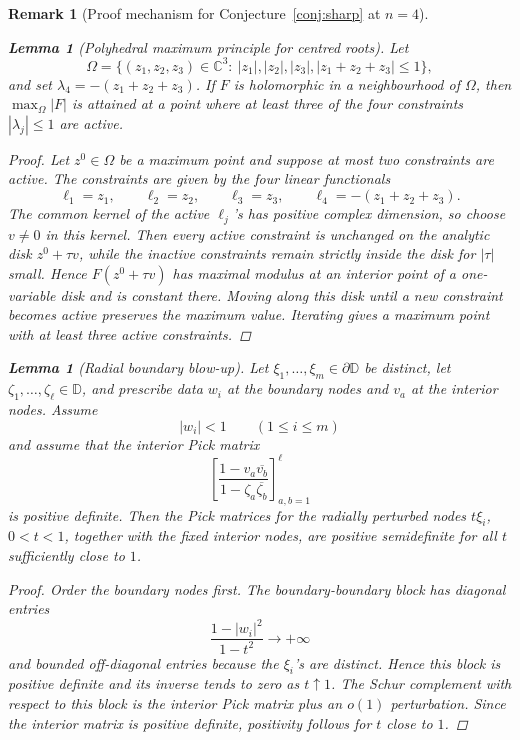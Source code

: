 \documentclass[11pt]{article}
\newtheorem{lemma}[theorem]{Lemma}
\newtheorem{remark}[theorem]{Remark}
\numberwithin{equation}{section}
\newcommand{\bbC}{\mathbb C}
\newcommand{\bbD}{\mathbb D}
\begin{document}
\begin{remark}[Proof mechanism for Conjecture~\ref{conj:sharp} at $n=4$]
\begin{lemma}[Polyhedral maximum principle for centred roots]
\label{lem:centred-polyhedral-maximum}
Let
\[
  \Omega=\{(z_1,z_2,z_3)\in\bbC^3:\ |z_1|,|z_2|,|z_3|,
  |z_1+z_2+z_3|\le1\},
\]
and set \(\lambda_4=-(z_1+z_2+z_3)\).  If \(F\) is holomorphic in a
neighbourhood of \(\Omega\), then \(\max_\Omega |F|\) is attained at a point
where at least three of the four constraints \(|\lambda_j|\le1\) are active.
\end{lemma}

\begin{proof}
Let \(z^0\in\Omega\) be a maximum point and suppose at most two constraints
are active.  The constraints are given by the four linear functionals
\[
  \ell_1=z_1,\qquad \ell_2=z_2,\qquad \ell_3=z_3,\qquad
  \ell_4=-(z_1+z_2+z_3).
\]
The common kernel of the active \(\ell_j\)'s has positive complex dimension,
so choose \(v\ne0\) in this kernel.  Then every active constraint is unchanged
on the analytic disk \(z^0+\tau v\), while the inactive constraints remain
strictly inside the disk for \(|\tau|\) small.  Hence \(F(z^0+\tau v)\) has
maximal modulus at an interior point of a one-variable disk and is constant
there.  Moving along this disk until a new constraint becomes active preserves
the maximum value.  Iterating gives a maximum point with at least three active
constraints.
\end{proof}

\begin{lemma}[Radial boundary blow-up]\label{lem:radial-boundary-blowup}
Let \(\xi_1,\ldots,\xi_m\in\partial\bbD\) be distinct, let
\(\zeta_1,\ldots,\zeta_\ell\in\bbD\), and prescribe data \(w_i\) at the
boundary nodes and \(v_a\) at the interior nodes.  Assume
\[
  |w_i|<1\qquad(1\le i\le m)
\]
and assume that the interior Pick matrix
\[
  \left[
  \frac{1-v_a\overline{v_b}}{1-\zeta_a\overline{\zeta_b}}
  \right]_{a,b=1}^\ell
\]
is positive definite.  Then the Pick matrices for the radially perturbed
nodes \(t\xi_i\), \(0<t<1\), together with the fixed interior nodes, are
positive semidefinite for all \(t\) sufficiently close to \(1\).
\end{lemma}

\begin{proof}
Order the boundary nodes first.  The boundary-boundary block has diagonal
entries
\[
  \frac{1-|w_i|^2}{1-t^2}\to+\infty
\]
and bounded off-diagonal entries because the \(\xi_i\)'s are distinct.  Hence
this block is positive definite and its inverse tends to zero as
\(t\uparrow1\).  The Schur complement with respect to this block is the
interior Pick matrix plus an \(o(1)\) perturbation.  Since the interior matrix
is positive definite, positivity follows for \(t\) close to \(1\).
\end{proof}


\end{remark}
\end{document}
